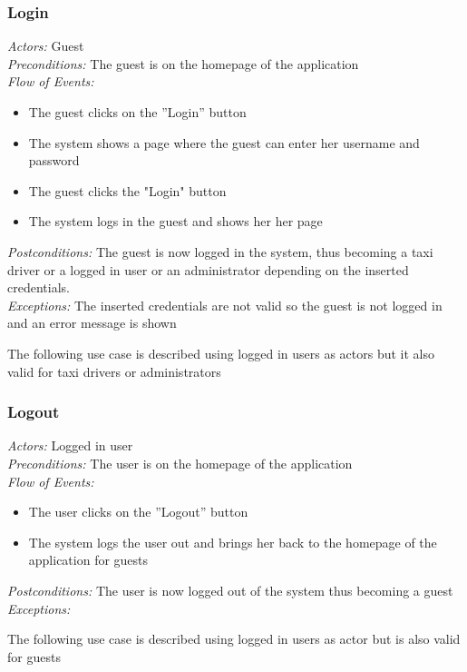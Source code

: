 \documentclass{article}
\begin{document}
	\subsubsection{Login}
	\textit{Actors:} Guest
	\\\textit{Preconditions:} The guest is on the homepage of the application
	\\\textit{Flow of Events:}
	\begin{itemize}
		\item  The guest clicks on the ''Login'' button
		\item  The system shows a page where the guest can enter her username and password
		\item  The guest clicks the "Login" button
		\item  The system logs in the guest and shows her her page
	\end{itemize}
	\textit{Postconditions:} The guest is now logged in the system, thus becoming a taxi driver or a logged in user or an administrator depending on the inserted credentials.
	\\\textit{Exceptions:} The inserted credentials are not valid so the guest is not logged in and an error message is shown
	
	The following use case is described using logged in users as actors but it also valid for taxi drivers or administrators
	\subsubsection{Logout}
	\textit{Actors:} Logged in user
	\\\textit{Preconditions:} The user is on the homepage of the application
	\\\textit{Flow of Events:}
	\begin{itemize}
		\item  The user clicks on the ''Logout'' button
		\item  The system logs the user out and brings her back to the homepage of the application for guests
	\end{itemize}
	\textit{Postconditions:} The user is now logged out of the system thus becoming a guest
	\\\textit{Exceptions:}
	
	The following use case is described using logged in users as actor but is also valid for guests
\end{document}
